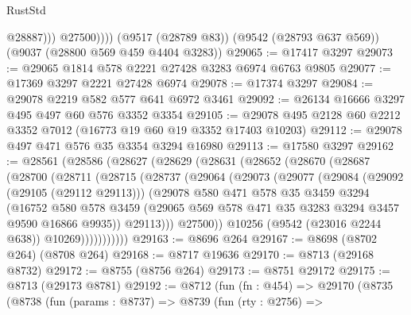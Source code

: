 \begin{lexlean}{RustStd}
\begin{coremodule}
                  @28887)))
            @27500))))
    (@9517 (@28789 @83))
    (@9542 (@28793 @637 @569))
    (@9037 (@28800 @569 @459 @4404 @3283))
@29065 := @17417 @3297
@29073 := @29065 @1814 @578 @2221 @27428 @3283 @6974 @6763 @9805
@29077 := @17369 @3297 @2221 @27428 @6974
@29078 := @17374 @3297
@29084 := @29078 @2219 @582 @577 @641 @6972 @3461
@29092 := @26134 @16666 @3297 @495 @497 @60 @576 @3352 @3354
@29105 := @29078 @495 @2128 @60 @2212 @3352 @7012 (@16773 @19 @60 @19 @3352 @17403 @10203)
@29112 := @29078 @497 @471 @576 @35 @3354 @3294 @16980
@29113 := @17580 @3297
@29162 := @28561
    (@28586
      (@28627
        (@28629
          (@28631
            (@28652
              (@28670
                (@28687
                  (@28700
                    (@28711
                      (@28715
                        (@28737
                          (@29064
                            (@29073
                              (@29077
                                (@29084
                                  (@29092 (@29105 (@29112 @29113)))
                                  (@29078
                                    @580
                                    @471
                                    @578
                                    @35
                                    @3459
                                    @3294
                                    (@16752
                                      @580
                                      @578
                                      @3459
                                      (@29065
                                        @569
                                        @578
                                        @471
                                        @35
                                        @3283
                                        @3294
                                        @3457
                                        @9590
                                        @16866
                                        @9935))
                                    @29113)))
                              @27500))
                          @10256
                          (@9542 (@23016 @2244 @638))
                          @10269)))))))))))
@29163 := @8696 @264
@29167 := @8698 (@8702 @264) (@8708 @264)
@29168 := @8717 @19636
@29170 := @8713 (@29168 @8732)
@29172 := @8755 (@8756 @264)
@29173 := @8751 @29172
@29175 := @8713 (@29173 @8781)
@29192 := @8712
    (fun (fn : @454) =>
    @29170
      (@8735
        (@8738
          (fun (params : @8737) =>
          @8739
            (fun (rty : @2756) =>

\end{coremodule}
\end{lexlean}

